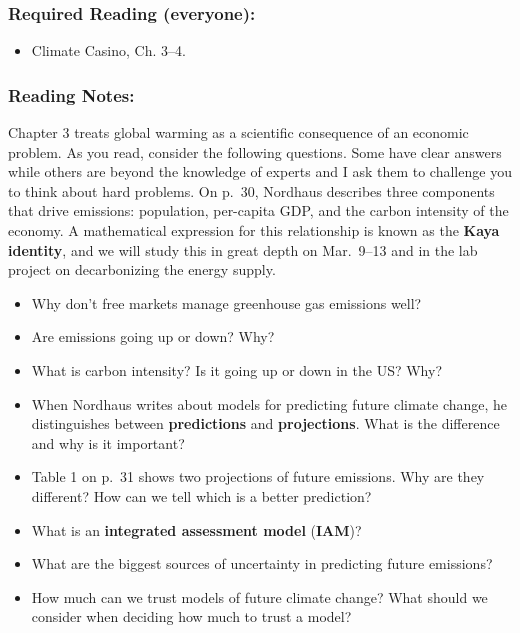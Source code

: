 \documentclass[
]{article}
\providecommand{\tightlist}{%
  \setlength{\itemsep}{0pt}\setlength{\parskip}{0pt}}
\newcommand{\COO}{\ce{CO2}}
\begin{document}
\hypertarget{required-reading-everyone-12}{%
\subsubsection{Required Reading
(everyone):}\label{required-reading-everyone-12}}

\begin{itemize}
\tightlist
\item
  Climate Casino, Ch. 3--4.
\end{itemize}

\hypertarget{reading-notes-12}{%
\subsubsection{Reading Notes:}\label{reading-notes-12}}

Chapter 3 treats global warming as a scientific consequence of an
economic problem. As you read, consider the following questions. Some
have clear answers while others are beyond the knowledge of experts and
I ask them to challenge you to think about hard problems. On p.~30,
Nordhaus describes three components that drive \COO emissions:
population, per-capita GDP, and the carbon intensity of the economy. A
mathematical expression for this relationship is known as the
\textbf{Kaya identity}, and we will study this in great depth on
Mar.~9--13 and in the lab project on decarbonizing the energy supply.

\begin{itemize}
\tightlist
\item
  Why don't free markets manage greenhouse gas emissions well?
\item
  Are \COO emissions going up or down? Why?
\item
  What is carbon intensity? Is it going up or down in the US? Why?
\item
  When Nordhaus writes about models for predicting future climate
  change, he distinguishes between \textbf{predictions} and
  \textbf{projections}. What is the difference and why is it important?
\item
  Table 1 on p.~31 shows two projections of future \COO emissions. Why
  are they different? How can we tell which is a better prediction?
\item
  What is an \textbf{integrated assessment model} (\textbf{IAM})?
\item
  What are the biggest sources of uncertainty in predicting future
  \COO emissions?
\item
  How much can we trust models of future climate change? What should we
  consider when deciding how much to trust a model?
\end{itemize}
\end{document}
